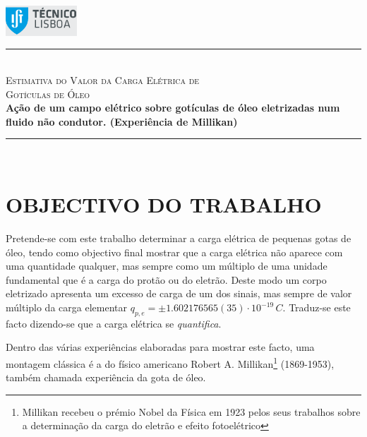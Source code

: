 \documentclass[a4paper,twoside,12pt]{article}      %
\author{Prof. Bernardo B. Carvalho}
\date{ Setembro 2012}
\newcommand{\HRule}{\rule{\linewidth}{0.5mm}}
\begin{document}
 

	\includegraphics[width=0.2\textwidth]{../logo-ist}%

		\HRule \\[0.5cm]
	{ \huge \sf  \textsc{Estimativa do Valor da Carga Elétrica de \\
		Gotículas de Óleo} }\\[0.4cm] %
	{ \large \bfseries  
Ação de um campo elétrico sobre gotículas de óleo eletrizadas num fluido não 
condutor. (Experiência de Millikan)}\\
	\HRule \\%




\section{\sf OBJECTIVO DO TRABALHO}
Pretende-se com este trabalho determinar a carga elétrica de pequenas gotas de óleo, tendo como objectivo final mostrar que a carga elétrica não aparece com uma quantidade qualquer, mas sempre como um múltiplo de uma unidade fundamental que é a carga do protão ou do eletrão. Deste modo um corpo eletrizado apresenta um excesso de carga de um dos sinais, mas sempre de valor múltiplo da carga elementar $q_{p,e}=\pm 1.602176565(35)\cdot 10^{-19}\,C$.
Traduz-se este facto dizendo-se que a carga elétrica se \emph{quantifica}.

Dentro das várias experiências elaboradas para mostrar este facto, uma montagem clássica é a do físico americano Robert A. Millikan\footnote{Millikan recebeu o prémio Nobel da Física em 1923 pelos seus trabalhos sobre a determinação da carga do eletrão e efeito fotoelétrico } (1869-1953), também chamada experiência da gota de óleo.
\end{document}
